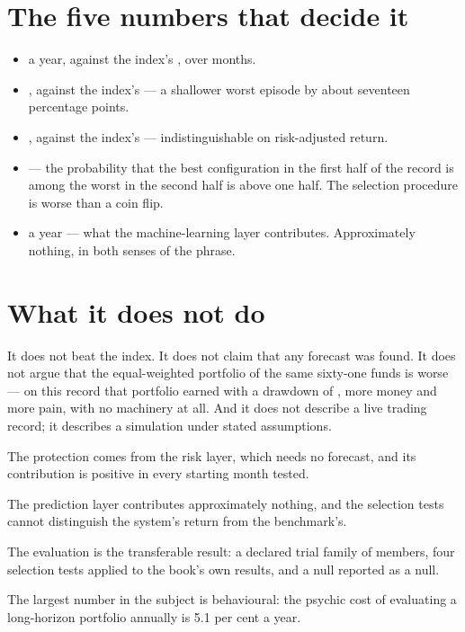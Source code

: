 \section*{The five numbers that decide it}

\begin{itemize}
\item \textbf{\numFullCAGR{}} a year, against the index's
\textbf{\numSpyCAGR{}}, over \numRecordMonths{} months.
\item \textbf{\numFullDD{}}, against the index's \textbf{\numSpyDD{}} ---
a shallower worst episode by about seventeen percentage points.
\item \textbf{\numFullSharpe{}}, against the index's \textbf{\numSpySharpe{}}
--- indistinguishable on risk-adjusted return.
\item \textbf{\numPBO{}} --- the probability that the best configuration in
the first half of the record is among the worst in the second half is
above one half. The selection procedure is worse than a coin flip.
\item \textbf{\numTiltMean{}} a year --- what the machine-learning layer
contributes. Approximately nothing, in both senses of the phrase.
\end{itemize}

\section*{What it does not do}

It does not beat the index. It does not claim that any forecast was
found. It does not argue that the equal-weighted portfolio of the same
sixty-one funds is worse --- on this record that portfolio earned
\textbf{\numEqualCAGR{}} with a drawdown of \textbf{\numEqualDD{}}, more
money and more pain, with no machinery at all. And it does not describe a
live trading record; it describes a simulation under stated assumptions.

\begin{keytakeaways}
\item The protection comes from the risk layer, which needs no forecast,
and its contribution is positive in every starting month tested.
\item The prediction layer contributes approximately nothing, and the
selection tests cannot distinguish the system's return from the
benchmark's.
\item The evaluation is the transferable result: a declared trial family
of \numFamilySize{} members, four selection tests applied to the book's
own results, and a null reported as a null.
\item The largest number in the subject is behavioural: the psychic cost of
evaluating a long-horizon portfolio annually is 5.1 per cent a year.
\end{keytakeaways}
\clearpage

